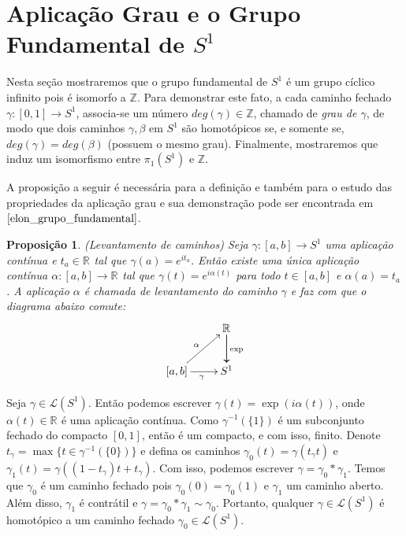 \documentclass[12pt]{book}
\newtheorem{proposicao}[teorema]{Proposição}
\newcommand{\caminhos}{\mathcal{L}}
\newcommand{\caminhossempontobase}[1]{\caminhos(#1)}
\newcommand{\circulo}{S^{1}}
\newcommand{\inteiros}{\mathbb{Z}}
\newcommand{\intervalo}{[0,1]}
\newcommand{\real}[1]{\mathbb{R}^{#1}}
\newcommand{\reta}{\real{}}
\begin{document}
	\section{Aplicação Grau e o Grupo Fundamental de $\circulo$}
	Nesta seção mostraremos que o grupo fundamental de $S^{1}$ é um grupo cíclico infinito pois é isomorfo a $\inteiros$. Para demonstrar este fato, a cada caminho fechado $\gamma:[0,1] \to S^{1}$, associa-se um número $deg(\gamma) \in \inteiros$, chamado de \textit{grau de $\gamma$}, de modo que dois caminhos $\gamma, \beta$ em $S^{1}$ são homotópicos se, e somente se, $deg(\gamma) = deg(\beta)$ (possuem o mesmo grau). Finalmente, mostraremos que induz um isomorfismo entre $\pi_{1}(S^{1})$ e $\inteiros$.
	
	A proposição a seguir é necessária para a definição e também para o estudo das propriedades da aplicação grau e sua demonstração pode ser encontrada em $\cite{elon_grupo_fundamental}$.
	
	\begin{proposicao}\label{proposicao_levantamento_curvas}
		(Levantamento de caminhos) Seja $\gamma:[a,b] \to S^{1}$ uma aplicação contínua e $t_{a}\in \real{}$ tal que $\gamma(a) = e^{it_{a}}$. Então existe uma única aplicação contínua $\alpha:[a,b] \to \real{}$ tal que $\gamma(t) = e^{i\alpha(t)}$ para todo $t\in [a,b]$ e $\alpha(a) = t_{a}$. A aplicação $\alpha$ é chamada de levantamento do caminho $\gamma$ e faz com que o diagrama abaixo comute:
		$$
		\xymatrix{
			& \real{}\ar[d]\ar[d]^{\text{exp}}
			\\
			[a,b]\ar[ur]^{\alpha} \ar[r]_{\gamma} & S^{1}
		}
		$$
	\end{proposicao}
	
	Seja $\gamma \in \caminhossempontobase{\circulo}$. Então podemos escrever $\gamma(t) = \exp(i\alpha(t))$, onde $\alpha(t) \in \reta$ é uma aplicação contínua. Como $\gamma^{-1}(\{1\})$ é um subconjunto fechado do compacto $\intervalo$, então é um compacto, e com isso, finito. Denote $t_{\gamma} = \max\{t \in \gamma^{-1}(\{0\})\}$ e defina os caminhos $\gamma_{0}(t) = \gamma(t_{\gamma}t)$ e $\gamma_{1}(t) = \gamma((1-t_{\gamma})t+t_{\gamma})$. Com isso, podemos escrever $\gamma = \gamma_{0}*\gamma_{1}$. Temos que $\gamma_{0}$ é um caminho fechado pois $\gamma_{0}(0) = \gamma_{0}(1)$ e $\gamma_{1}$ um caminho aberto. Além disso, $\gamma_{1}$ é contrátil e $\gamma = \gamma_{0}*\gamma_{1} \sim \gamma_{0}$. Portanto, qualquer $\gamma \in \caminhos(\circulo)$ é homotópico a um caminho fechado $\gamma_{0} \in \caminhos(\circulo)$.
	
\end{document}
